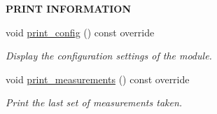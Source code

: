 \begin{Indent}{\bf P\+R\+I\+NT I\+N\+F\+O\+R\+M\+A\+T\+I\+ON}\par
\begin{DoxyCompactItemize}
\item 
void \hyperlink{class_loom___analog_ae41c9795ceb9079b88a87cb64d7869cf}{print\+\_\+config} () const override
\begin{DoxyCompactList}\small\item\em Display the configuration settings of the module. \end{DoxyCompactList}\item 
void \hyperlink{class_loom___analog_a981f42f7a1358ea77ec087df13859406}{print\+\_\+measurements} () const override
\begin{DoxyCompactList}\small\item\em Print the last set of measurements taken. \end{DoxyCompactList}\end{DoxyCompactItemize}
\end{Indent}
